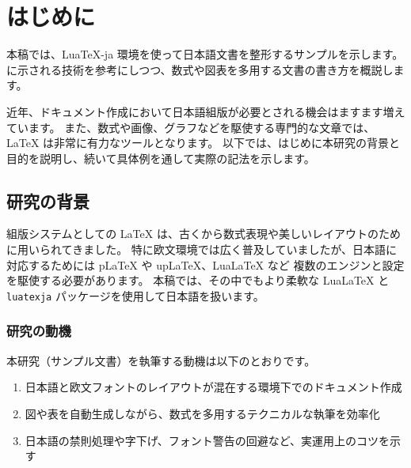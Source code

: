 \documentclass[a4paper,10.5pt]{ltjsarticle}
\begin{document}

\tableofcontents
\thispagestyle{empty}



\clearpage
\setcounter{page}{1}

\section{はじめに}
本稿では、Lua\TeX-ja 環境を使って日本語文書を整形するサンプルを示します。
\cite{Example2023} に示される技術を参考にしつつ、数式や図表を多用する文書の書き方を概説します。

近年、ドキュメント作成において日本語組版が必要とされる機会はますます増えています。
また、数式や画像、グラフなどを駆使する専門的な文章では、LaTeX は非常に有力なツールとなります。
以下では、はじめに本研究の背景と目的を説明し、続いて具体例を通して実際の記法を示します。

\subsection{研究の背景}
組版システムとしての LaTeX は、古くから数式表現や美しいレイアウトのために用いられてきました。
特に欧文環境では広く普及していましたが、日本語に対応するためには pLaTeX や upLaTeX、LuaLaTeX など
複数のエンジンと設定を駆使する必要があります。  
本稿では、その中でもより柔軟な LuaLaTeX と \texttt{luatexja} パッケージを使用して日本語を扱います。

\subsubsection{研究の動機}
本研究（サンプル文書）を執筆する動機は以下のとおりです。
\begin{enumerate}
  \item 日本語と欧文フォントのレイアウトが混在する環境下でのドキュメント作成
  \item 図や表を自動生成しながら、数式を多用するテクニカルな執筆を効率化
  \item 日本語の禁則処理や字下げ、フォント警告の回避など、実運用上のコツを示す
\end{enumerate}

\end{document}
